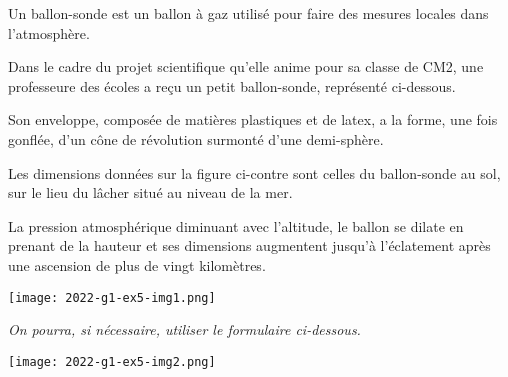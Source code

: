 \begin{minipage}{.6\linewidth}
	Un ballon-sonde est un ballon à gaz utilisé pour faire des mesures locales dans l'atmosphère.

\bigskip
Dans le cadre du projet scientifique qu'elle anime pour sa classe de CM2, une professeure des écoles a reçu un petit ballon-sonde, représenté ci-dessous.

\bigskip
Son enveloppe, composée de matières plastiques et de latex, a la forme, une fois gonflée, d'un cône de révolution surmonté d'une demi-sphère.

\bigskip
Les dimensions données sur la figure ci-contre sont celles du ballon-sonde au sol, sur le lieu du lâcher situé au niveau de la mer.

\bigskip
La pression atmosphérique diminuant avec l'altitude, le ballon se dilate en prenant de la hauteur et ses dimensions augmentent jusqu'à l'éclatement après une ascension de plus de vingt kilomètres.

\end{minipage}
\begin{minipage}{.4\linewidth}
	\centering
	\texttt{[image: 2022-g1-ex5-img1.png]}
\end{minipage}

\bigskip
\textit{On pourra, si nécessaire, utiliser le formulaire ci-dessous.}

\begin{center}
\texttt{[image: 2022-g1-ex5-img2.png]}	
\end{center}


